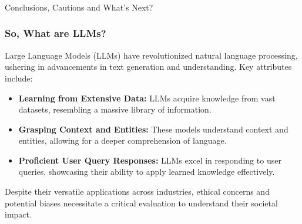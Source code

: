 \begin{frame}[fragile]\frametitle{}
\begin{center}
{\Large Conclusions, Cautions and What's Next?}
\end{center}
\end{frame}


\begin{frame}[fragile]\frametitle{So, What are LLMs?}

  Large Language Models (LLMs) have revolutionized natural language processing, ushering in advancements in text generation and understanding. Key attributes include:

  \begin{itemize}
    \item \textbf{Learning from Extensive Data:} LLMs acquire knowledge from vast datasets, resembling a massive library of information.

    \item \textbf{Grasping Context and Entities:} These models understand context and entities, allowing for a deeper comprehension of language.

    \item \textbf{Proficient User Query Responses:} LLMs excel in responding to user queries, showcasing their ability to apply learned knowledge effectively.

  \end{itemize}

  Despite their versatile applications across industries, ethical concerns and potential biases necessitate a critical evaluation to understand their societal impact.

\end{frame}



